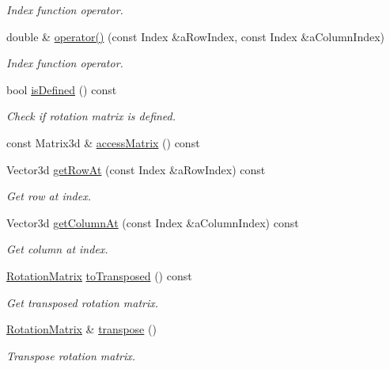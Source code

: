 \begin{DoxyCompactItemize}
\begin{DoxyCompactList}\small\item\em Index function operator. \end{DoxyCompactList}\item 
double \& \hyperlink{classlibrary_1_1math_1_1geom_1_1trf_1_1rot_1_1_rotation_matrix_a09a9da15d503894cf85e47c0b7238a77}{operator()} (const Index \&a\+Row\+Index, const Index \&a\+Column\+Index)
\begin{DoxyCompactList}\small\item\em Index function operator. \end{DoxyCompactList}\item 
bool \hyperlink{classlibrary_1_1math_1_1geom_1_1trf_1_1rot_1_1_rotation_matrix_aa5034776af47fc1eacb77359cef04550}{is\+Defined} () const
\begin{DoxyCompactList}\small\item\em Check if rotation matrix is defined. \end{DoxyCompactList}\item 
const Matrix3d \& \hyperlink{classlibrary_1_1math_1_1geom_1_1trf_1_1rot_1_1_rotation_matrix_a957387a407da1658fa63dc6692254175}{access\+Matrix} () const
\item 
Vector3d \hyperlink{classlibrary_1_1math_1_1geom_1_1trf_1_1rot_1_1_rotation_matrix_a71dca1f50f8073256ff69bb365c3a772}{get\+Row\+At} (const Index \&a\+Row\+Index) const
\begin{DoxyCompactList}\small\item\em Get row at index. \end{DoxyCompactList}\item 
Vector3d \hyperlink{classlibrary_1_1math_1_1geom_1_1trf_1_1rot_1_1_rotation_matrix_a637e10366c51b6e2137b1454522c5c07}{get\+Column\+At} (const Index \&a\+Column\+Index) const
\begin{DoxyCompactList}\small\item\em Get column at index. \end{DoxyCompactList}\item 
\hyperlink{classlibrary_1_1math_1_1geom_1_1trf_1_1rot_1_1_rotation_matrix}{Rotation\+Matrix} \hyperlink{classlibrary_1_1math_1_1geom_1_1trf_1_1rot_1_1_rotation_matrix_aafb93f71d64ff383a58a9b9c4816a117}{to\+Transposed} () const
\begin{DoxyCompactList}\small\item\em Get transposed rotation matrix. \end{DoxyCompactList}\item 
\hyperlink{classlibrary_1_1math_1_1geom_1_1trf_1_1rot_1_1_rotation_matrix}{Rotation\+Matrix} \& \hyperlink{classlibrary_1_1math_1_1geom_1_1trf_1_1rot_1_1_rotation_matrix_ad289d307f62b26ab7e1340698388789a}{transpose} ()
\begin{DoxyCompactList}\small\item\em Transpose rotation matrix. \end{DoxyCompactList}\end{DoxyCompactItemize}

